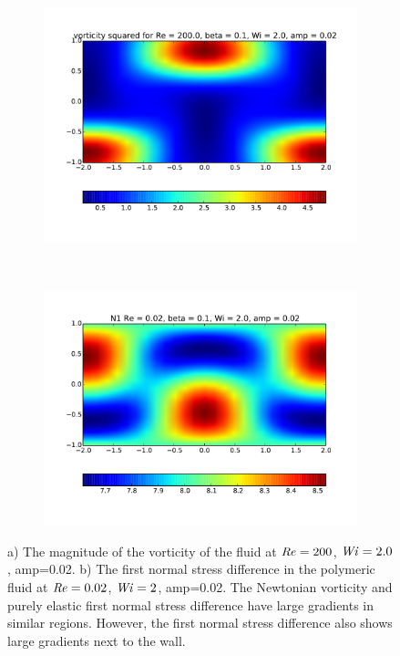 \documentclass{jfm}
\newcommand\Wi{\mbox{\textit{Wi}}}
\newcommand\Rey{\mbox{\textit{Re}}}  %
\begin{document}
\begin{figure}
    \centering
    \begin{subfigure}[b]{0.48\textwidth}
	\includegraphics[width=\textwidth]{./figures/vorticity_map_Re200_Wi2_amp002}
	\label{fig:pf_vort_map}
    \end{subfigure}
    ~
    \begin{subfigure}[b]{0.48\textwidth}
	\includegraphics[width=\textwidth]{./figures/N1_map_Rey002_Wi2_amp002}
	\label{fig:pf_N1_map}
    \end{subfigure}
    \caption{
	a) The magnitude of the vorticity of the fluid at $\Rey = 200$, $\Wi =
	2.0$, amp=0.02. b) The first normal stress difference in the polymeric
	fluid at $\Rey = 0.02$, $\Wi = 2$, amp=0.02. The Newtonian vorticity
	and purely elastic first normal stress difference have large gradients
	in similar regions. However, the first normal stress difference also
	shows large gradients next to the wall. 
    } 
\end{figure}
\end{document}
